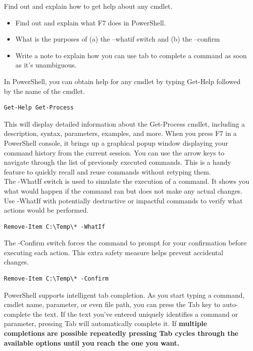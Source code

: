 \documentclass[a4paper]{article}
\begin{document}
\noindent
\textcolor{green!50!black}{
Find out and explain how to get help about any cmdlet.
\begin{itemize}
    \item Find out and explain what F7 does in PowerShell.
    \item  What is the purposes of (a) the –whatif switch and (b) the –confirm
    \item Write a note to explain how you can use tab to complete a command as soon as
    it’s unambiguous.  
\end{itemize}
}
\noindent
In PowerShell, you can obtain help for any cmdlet by typing Get-Help followed by the name of the cmdlet.
\begin{verbatim}
Get-Help Get-Process
\end{verbatim}
This will display detailed information about the Get-Process cmdlet, including a description, syntax, parameters, examples, and more.
When you press F7 in a PowerShell console, it brings up a graphical popup window displaying your command history from the current session.
You can use the arrow keys to navigate through the list of previously executed commands. This is a handy feature to quickly recall and reuse commands without retyping them.
\\
The -WhatIf switch is used to simulate the execution of a command. It shows you what would happen if the command ran but does not make any actual changes.
Use -WhatIf with potentially destructive or impactful commands to verify what actions would be performed.
\begin{verbatim}
Remove-Item C:\Temp\* -WhatIf
\end{verbatim}
The -Confirm switch forces the command to prompt for your confirmation before executing each action. This extra safety measure helps prevent accidental changes.
\begin{verbatim}
Remove-Item C:\Temp\* -Confirm
\end{verbatim}
\noindent
PowerShell supports intelligent tab completion. As you start typing a command, cmdlet name, parameter, or even file path, you can press the Tab key to auto-complete the text.
If the text you've entered uniquely identifies a command or parameter, pressing Tab will automatically complete it.
If \textbf{multiple completions are possible repeatedly pressing Tab cycles through the available options until you reach the one you want.}
\end{document}
